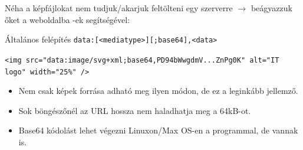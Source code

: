 \begin{frame}
  Néha a képfájlokat nem tudjuk/akarjuk feltölteni egy szerverre $\to$ beágyazzuk őket a weboldalba -ek segítségével:
  \vfill
  \begin{exampleblock}{Általános felépítés}
    \texttt{data:[<mediatype>][;base64],<data>}
  \end{exampleblock}
  \begin{exampleblock}{}
    \scriptsize
    \texttt{<img src="data:image/svg+xml;base64,PD94bWwgdmV...ZnPg0K" alt="IT logo" width="25\%" />}
  \end{exampleblock}
  \vfill
  \small
  \begin{itemize}
    \item Nem csak képek forrása adható meg ilyen módon, de ez a leginkább jellemző.
    \item Sok böngészőnél az URL hossza nem haladhatja meg a 64kB-ot.
    \item Base64 kódolást lehet végezni Linuxon/Max OS-en a  programmal, de vannak   is.
  \end{itemize}
\end{frame}

